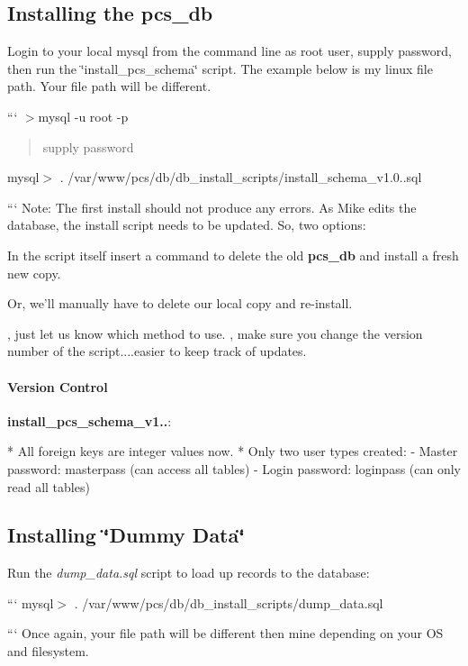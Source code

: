 \subsection*{Installing the pcs\-\_\-db}

Login to your local mysql from the command line as root user, supply password, then run the \char`\"{}install\-\_\-pcs\-\_\-schema\char`\"{} script. The example below is my linux file path. Your file path will be different.

``` $>$mysql -\/u root -\/p

\begin{quotation}
supply password

\end{quotation}


mysql$>$ . /var/www/pcs/db/db\-\_\-install\-\_\-scripts/install\-\_\-schema\-\_\-v1.0..\-sql

``` Note\-: The first install should not produce any errors. As Mike edits the database, the install script needs to be updated. So, two options\-:

In the script itself insert a command to delete the old {\bfseries pcs\-\_\-db} and install a fresh new copy.

Or, we'll manually have to delete our local copy and re-\/install.

, just let us know which method to use. , make sure you change the version number of the script....easier to keep track of updates.

\paragraph*{Version Control}

{\bfseries install\-\_\-pcs\-\_\-schema\-\_\-v1..}\-: \begin{DoxyVerb}* All foreign keys are integer values now.
* Only two user types created:
    - Master  password: masterpass (can access all tables)
    - Login   password: loginpass  (can only read all tables) 
\end{DoxyVerb}


\subsection*{Installing \char`\"{}\-Dummy Data\char`\"{}}

Run the {\itshape dump\-\_\-data.\-sql} script to load up records to the database\-:

``` mysql$>$ . /var/www/pcs/db/db\-\_\-install\-\_\-scripts/dump\-\_\-data.sql

``` Once again, your file path will be different then mine depending on your O\-S and filesystem. 